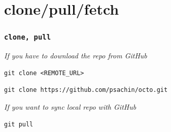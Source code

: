 \documentclass[bigger, presentation]{beamer}
\begin{document}
\section{clone/pull/fetch}
\label{sec-2}
\begin{frame}[fragile]
\frametitle{\texttt{clone, pull}}
\label{sec-2-1}

   
   \emph{If you have to download the repo from GitHub}

\begin{verbatim}
git clone <REMOTE_URL>
\end{verbatim}


\begin{verbatim}
git clone https://github.com/psachin/octo.git
\end{verbatim}


   \emph{If you want to sync local repo with GitHub}

\begin{verbatim}
git pull
\end{verbatim}
\end{frame}
\end{document}
